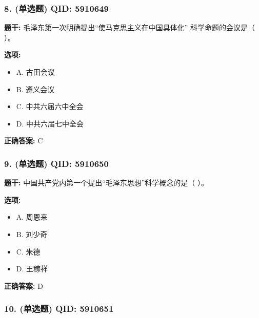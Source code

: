 \documentclass[12pt,UTF8]{ctexart}
\begin{document}
\subsubsection*{8. (单选题) \small QID: 5910649}

\textbf{题干:}
毛泽东第一次明确提出“使马克思主义在中国具体化” 科学命题的会议是（ ）。

\textbf{选项:}
\begin{itemize}[leftmargin=*]

  \item A. 古田会议

  \item B. 遵义会议

  \item C. 中共六届六中全会

  \item D. 中共六届七中全会

\end{itemize}

\textbf{正确答案:}
C

\vspace{0.3em}\hrulefill\vspace{0.7em}

\subsubsection*{9. (单选题) \small QID: 5910650}

\textbf{题干:}
中国共产党内第一个提出“毛泽东思想”科学概念的是（ ）。

\textbf{选项:}
\begin{itemize}[leftmargin=*]

  \item A. 周恩来

  \item B. 刘少奇

  \item C. 朱德

  \item D. 王稼祥

\end{itemize}

\textbf{正确答案:}
D

\vspace{0.3em}\hrulefill\vspace{0.7em}

\subsubsection*{10. (单选题) \small QID: 5910651}
\end{document}
